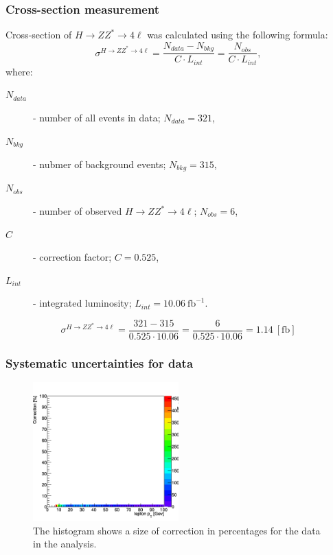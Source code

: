 \documentclass[aspectratio=1610, english]{beamer}
\newcommand{\hzz}{ H\rightarrow ZZ^{*}\rightarrow 4 \ell}
\begin{document}
\begin{frame}
\frametitle{Cross-section measurement}
Cross-section of $\hzz$ was calculated using the following formula:
\begin{equation}
\sigma^{\hzz}=\frac{N_{data}-N_{bkg}}{C\cdot L_{int}}=\frac{N_{obs}}{C\cdot L_{int}} ,
\end{equation}
where:
\begin{description}
\item[$N_{data}$] - number of all events in data; $N_{data}=321$,
\item[$N_{bkg}$] - nubmer of background events; $N_{bkg}=315$,
\item[$N_{obs}$] - number of observed $\hzz$; $N_{obs}=6$,
\item[$C$] - correction factor; $C=0.525$,
\item[$L_{int}$] - integrated luminosity; $L_{int}=10.06 \: \mathrm{fb}^{-1}$.
\end{description}
\vspace{1cm}
\begin{equation}
\sigma^{\hzz}=\frac{321-315}{0.525\cdot 10.06}=\frac{6}{0.525\cdot 10.06}=1.14 \: [\mathrm{fb}]
\end{equation}

\end{frame}

\begin{frame}
\frametitle{Systematic uncertainties for data}

\begin{figure} [H]
\centering
\includegraphics[width=0.5\textwidth]{syst1_data.png}
\caption{The histogram shows a size of correction in percentages for the data in the analysis. }
\end{figure}

\end{frame}
\end{document}
